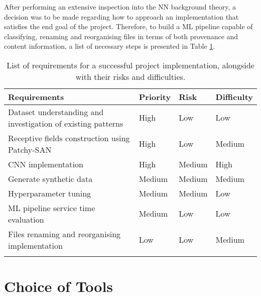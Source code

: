 After performing an extensive inspection into the NN background theory, a decision was to be made regarding how to approach an implementation that satisfies the end goal of the project. Therefore, to build a ML pipeline capable of classifying, renaming and reorganising files in terms of both provenance and content information, a list of necessary steps is presented in Table \ref{Requirements overview}. \bigskip

\begin{longtable}{|p{}|p{}|p{}|p{}|}
  \hline
  \textbf{Requirements}                                        & \textbf{Priority} & \textbf{Risk} & \textbf{Difficulty} \\
  \hline
  Dataset understanding and investigation of existing patterns & High              & Low           & Low                 \\

  Receptive fields construction using Patchy-SAN               & High              & Low           & Medium              \\

  CNN implementation                                           & High              & Medium        & High                \\

  Generate synthetic data                                      & Medium            & Medium        & Medium              \\

  Hyperparameter tuning                                        & Medium            & Medium        & Low                 \\

  ML pipeline service time evaluation                          & Medium            & Low           & Low                 \\

  Files renaming and reorganising implementation               & Low               & Low           & Medium              \\

  \hline
  \caption[Requirements overview]{List of requirements for a successful project implementation, alongside with their risks and difficulties.}
  \label{Requirements overview}
\end{longtable} \bigskip


\section{Choice of Tools}

